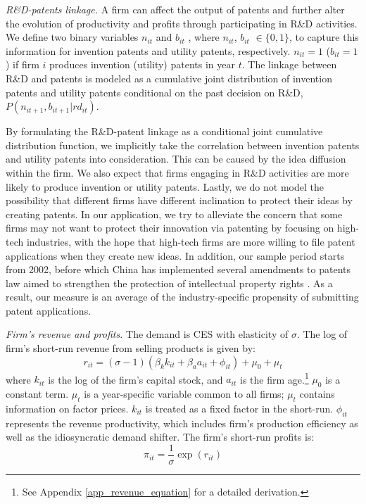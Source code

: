 \documentclass[English]{article}
\begin{document}
\textit{R\&D-patents linkage.} A firm can affect the output of patents and further alter the evolution of
productivity and profits through participating in R\&D activities. We define two binary variables $n_{it}$ and $b_{it}$ , where $n_{it}$, $b_{it}$ $\in\{0,1\}$, to capture this information for invention patents and utility patents, respectively. $n_{it}=1$ ($b_{it}=1$) if firm $i$ produces invention (utility) patents in year $t$. The linkage
between R\&D and patents is modeled as a cumulative joint distribution of invention patents and utility patents conditional on the past decision on R\&D, $P(n_{it+1}, b_{it+1}|rd_{it})$.

By formulating the R\&D-patent linkage as a conditional joint cumulative distribution function, we implicitly take the correlation between invention patents and utility patents into consideration. This can be caused by the idea diffusion within the firm. We also expect that firms engaging in R\&D activities are more likely to produce invention or utility patents. Lastly, we do not model the possibility that different firms have different inclination to protect their ideas by creating patents. In our application, we try to alleviate the concern that some firms may not want to protect their innovation via patenting by focusing on high-tech industries, with the hope that high-tech firms are more willing to file patent applications when they create new ideas. In addition, our sample period starts from 2002, before which China has implemented several amendments to patents law aimed to strengthen the protection of intellectual property rights \citep{Hu2009}. As a result, our measure is an average of the industry-specific propensity of submitting patent applications.

\textit{Firm's revenue and profits.} The demand is CES with elasticity of $\sigma$. The log of firm's short-run revenue from selling products is given by:
\begin{equation} \label{log-rev}
    r_{it} =(\sigma-1)(\beta_k k_{it}+\beta_aa_{it}+\phi_{it}) +\mu_0+\mu_t
\end{equation}
where $k_{it}$ is the log of the firm's capital stock, and $a_{it}$ is the firm age.\footnote{See Appendix \ref{app_revenue_equation} for a detailed derivation.} $\mu_0$ is a constant term. $\mu_t$ is a year-specific variable common to all firms; $\mu_t$ contains information on factor prices. $k_{it}$ is treated as a fixed factor in the short-run. $\phi_{it}$ represents the revenue productivity, which includes firm's production efficiency as well as the idiosyncratic demand shifter. The firm's short-run profits is:
\begin{equation}
    \pi_{it} = \frac{1}{\sigma}\exp(r_{it})
\end{equation}
\end{document}
